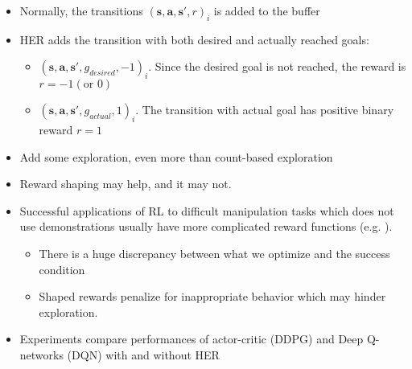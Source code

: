 \begin{itemize}
	\item Normally, the transitions $ (\textbf{s}, \textbf{a} ,\textbf{s}', r)_i $ is added to the buffer
	\item \ac{HER} adds the transition with both desired and actually reached goals:
	\begin{itemize}
		\item $ (\textbf{s}, \textbf{a} ,\textbf{s}', g_{desired}, -1)_i $. Since the desired goal is not reached, the reward is $ r=-1 (\text{or } 0) $
		\item $ (\textbf{s}, \textbf{a} ,\textbf{s}', g_{actual}, 1)_i $. The transition with actual goal has positive binary reward $ r=1 $
	\end{itemize}
	\item Add some exploration, even more than count-based exploration
	\item Reward shaping may help, and it may not.
	\item \note Successful applications of \ac{RL} to difficult manipulation tasks which does not use
	demonstrations usually have more complicated reward functions (e.g. \cite{popov2017data}).
	\begin{itemize}
		\item There is a huge discrepancy between what we optimize and the success condition
		\item Shaped rewards penalize for inappropriate behavior which may hinder exploration.
	\end{itemize}
	\item Experiments compare performances of actor-critic (DDPG) \cite{lillicrap2015continuous} and Deep Q-networks (DQN) \cite{mnih2015human} with and without \ac{HER}
\end{itemize}


